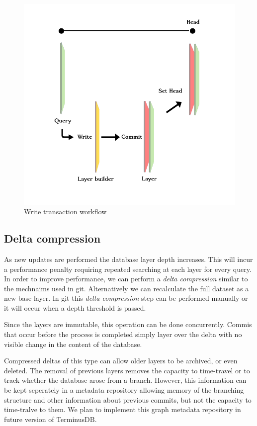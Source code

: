 \documentclass[10pt, a4paper, twocolumn]{article} %
\begin{document}
\begin{figure}
	\includegraphics[width=\linewidth]{query_write_commit_head} %
	\caption{Write transaction workflow} %
	\label{workflow} %
\end{figure}


\subsection{Delta compression}

As new updates are performed the database layer depth increases. This
will incur a performance penalty requiring repeated searching at each
layer for every query. In order to improve performance, we can perform
a {\em delta compression} similar to the mechnaims used in
git. Alternatively we can recalculate the full dataset as a new
base-layer. In git this {\em delta compression} step can be performed
manually or it will occur when a depth threshold is passed.

Since the layers are immutable, this operation can be done
concurrently. Commis that occur before the process is completed simply
layer over the delta with no visible change in the content of
the database.

Compressed deltas of this type can allow older layers to be archived,
or even deleted. The removal of previous layers removes the capacity
to time-travel or to track whether the database arose from a
branch. However, this information can be kept seperately in a metadata
repository allowing memory of the branching structure and other
information about previous commits, but not the capacity to
time-tralve to them. We plan to implement this graph metadata
repository in future version of TerminusDB.
\end{document}
